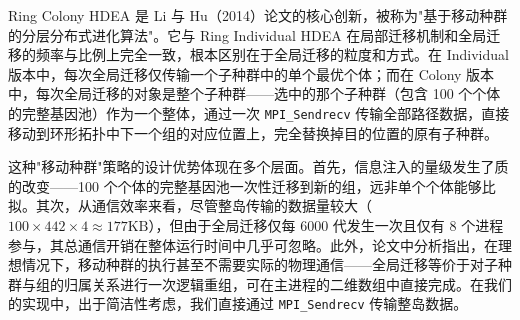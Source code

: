 Ring Colony HDEA 是 Li 与 Hu（2014）论文的核心创新，被称为"基于移动种群的分层分布式进化算法"。它与 Ring Individual HDEA 在局部迁移机制和全局迁移的频率与比例上完全一致，根本区别在于全局迁移的粒度和方式。在 Individual 版本中，每次全局迁移仅传输一个子种群中的单个最优个体；而在 Colony 版本中，每次全局迁移的对象是整个子种群——选中的那个子种群（包含 100 个个体的完整基因池）作为一个整体，通过一次 \texttt{MPI\_Sendrecv} 传输全部路径数据，直接移动到环形拓扑中下一个组的对应位置上，完全替换掉目的位置的原有子种群。

这种"移动种群"策略的设计优势体现在多个层面。首先，信息注入的量级发生了质的改变——100 个个体的完整基因池一次性迁移到新的组，远非单个个体能够比拟。其次，从通信效率来看，尽管整岛传输的数据量较大（$100 \times 442 \times 4 \approx 177\text{KB}$），但由于全局迁移仅每 6000 代发生一次且仅有 8 个进程参与，其总通信开销在整体运行时间中几乎可忽略。此外，论文中分析指出，在理想情况下，移动种群的执行甚至不需要实际的物理通信——全局迁移等价于对子种群与组的归属关系进行一次逻辑重组，可在主进程的二维数组中直接完成。在我们的实现中，出于简洁性考虑，我们直接通过 \texttt{MPI\_Sendrecv} 传输整岛数据。
